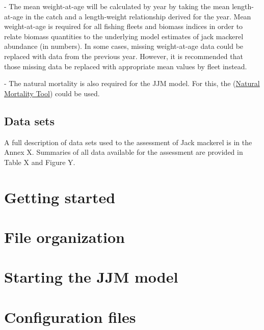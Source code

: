\documentclass{article}
\begin{document}
- The mean weight-at-age will be calculated by year by taking the mean length-at-age in the catch and a length-weight relationship derived for the year. Mean weight-at-age is required for all fishing fleets and biomass indices in order to relate biomass quantities to the underlying model estimates of jack mackerel abundance (in numbers). In some cases, missing weight-at-age data could be replaced with data from the previous year. However, it is recommended that those missing data be replaced with appropriate mean values by fleet instead. 

- The natural mortality is also required for the JJM model. For this, the (\href{https://connect.fisheries.noaa.gov/natural-mortality-tool/}{Natural Mortality Tool}) could be used. 

\subsection{Data sets}

A full description of data sets used to the assessment of Jack mackerel is in the Annex X. Summaries of all data available for the assessment are provided in Table X and Figure Y.

\section{Getting started} 

\section{File organization}

\section{Starting the JJM model}

\section{Configuration files}
\end{document}
